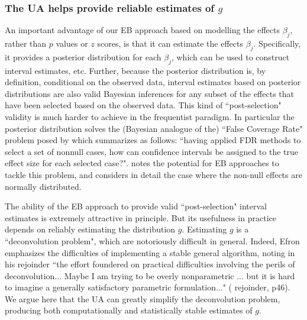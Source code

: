 \documentclass[11pt]{article}
\def\bhat{\hat{\beta}}
\begin{document}
\subsubsection*{The UA helps provide reliable estimates of $g$}

An important advantage of our EB approach based on modelling the effects $\beta_j$, rather than $p$ values or $z$ scores, is that it
can estimate the effects $\beta_j$.
Specifically, it provides a posterior distribution for each $\beta_j$, which can be used
to construct interval estimates, etc.
Further, because the posterior distribution is, by definition,
conditional on the observed data, interval estimates based on posterior distributions are also valid Bayesian inferences for any subset of the effects that have
been selected based on the observed data. This kind of ``post-selection" validity is much harder to achieve in the frequentist paradigm.
In particular the posterior distribution solves the (Bayesian analogue of the) ``False Coverage Rate" problem posed by
\cite{benjamini2005false} which \cite{efron2008microarrays} summarizes as follows: ``having applied FDR methods to select a set of nonnull cases,
how can confidence intervals be assigned to the true
effect size for each selected case?". \cite{efron2008microarrays} notes the potential for EB approaches to tackle this problem,
and \cite{zhao2012empirical} considers in detail the case where the non-null effects are normally distributed.

The ability of the EB approach to provide valid ``post-selection" interval estimates is extremely attractive in principle.
But its usefulness in practice
depends on reliably estimating the distribution $g$. Estimating $g$ is a ``deconvolution problem",
which are notoriously difficult in general. Indeed, Efron emphasizes
the difficulties of implementing a stable general algorithm, noting in his rejoinder
``the effort foundered on practical difficulties involving the perils of deconvolution... Maybe I am trying
to be overly nonparametric ... but it is hard to imagine a
generally satisfactory parametric formulation..." (\cite{efron2008microarrays} rejoinder, p46).
We argue here that the UA can greatly simplify the deconvolution problem, producing both computationally and statistically stable estimates of $g$.
\end{document}
